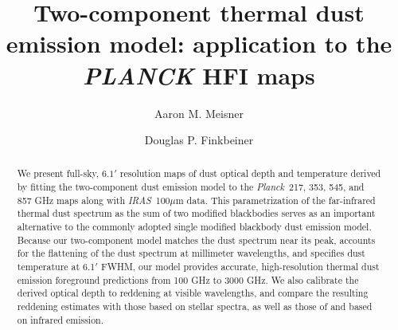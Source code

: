 \documentclass{emulateapj}
\newcommand{\IRAS}{{\it IRAS}}
\newcommand{\PLANCK}{{\it Planck}}
\begin{document}
\title{Two-component thermal dust emission model: application to the 
{\it PLANCK} HFI maps}
\author{Aaron M. Meisner}
\author{Douglas P. Finkbeiner}

\begin{abstract}
We present full-sky, $6.1'$ resolution maps of dust optical depth and 
temperature derived by fitting the \cite{FDS99} two-component dust emission 
model to the \PLANCK~217, 353, 545, and 857 GHz maps along with  
\IRAS~100$\mu$m data. This parametrization of the far-infrared thermal dust 
spectrum as the sum of two modified blackbodies serves as an important 
alternative to the commonly adopted single modified blackbody dust emission 
model. Because our two-component model matches the dust spectrum near its 
peak, accounts for the flattening of the dust spectrum at millimeter 
wavelengths, and specifies dust temperature at 6.1$'$ FWHM, our model 
provides accurate, high-resolution thermal dust emission foreground predictions
 from 100 GHz to 3000 GHz. We also calibrate the derived optical depth to 
reddening at visible wavelengths, and compare the resulting reddening estimates
with those based on stellar spectra, as well as those of \cite{SFD} and 
\cite{planckdust} based on infrared emission.




\end{abstract}
\end{document}
